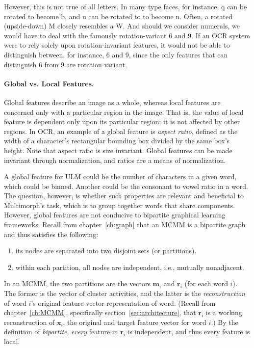  
However, this is not true of all letters. In many type faces, for instance, 
\textsf{q} can be rotated to become \textsf{b}, and \textsf{u} can be rotated to 
to become \textsf{n}. Often, a rotated (upside-down) \textsf{M} closely 
resembles a \textsf{W}. And should we consider numerals, we would have to deal 
with the famously rotation-variant \textsf{6} and \textsf{9}. If an 
\ac{OCR} system were to rely solely upon rotation-invariant features, it
would not be able to distinguish between, for instance, \textsf{6} and 
\textsf{9}, since the only features that can distinguish \textsf{6} from \textsf{9}
are rotation variant.

\paragraph{Global vs. Local Features.}
Global features describe an image as a whole, whereas local features are concerned
only with a particular region in the image. That is, the value of local feature is dependent
only upon its particular region; it is not affected by other regions. 
In \ac{OCR}, an example of a global feature is \emph{aspect ratio}, defined 
as the width of a character's rectangular bounding box divided by the same 
box's height. Note that aspect ratio is size invariant. Global features 
can be made invariant 
through normalization, and ratios are a means of normalization.

A global feature for ULM could be the number 
of characters in a given word, which could be binned. Another 
could be the consonant to vowel ratio in a word. The question, however, is 
whether such properties are relevant and beneficial to Multimorph's task,
which is to group together words that share components. 
However, global features are not conducive to bipartite graphical learning frameworks.
Recall from chapter~\ref{ch:graph} that an MCMM is a bipartite graph and thus 
satisfies the following:
\begin{enumerate}
\item its nodes are separated into two disjoint sets (or partitions).
\item within each partition, all nodes are independent, i.e., mutually 
nonadjacent.
\end{enumerate}
In an MCMM, the two partitions are the vectors $\textbf{m}_{i}$
and $\textbf{r}_{i}$ (for each word $i$). The former is the vector of 
cluster activities, and the latter
is the \emph{reconstruction} of word $i$'s original 
feature-vector representation of word. (Recall from chapter~\ref{ch:MCMM}, 
specifically section~\ref{sec:architecture}, that $\textbf{r}_i$ is a working
reconstruction of $\textbf{x}_i$, the original and target feature vector for word $i$.)
By the definition of \emph{bipartite}, \emph{every} feature in $\textbf{r}_i$ is independent,
and thus every feature is local. 

